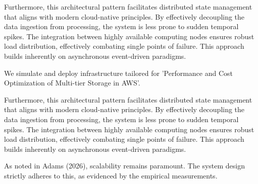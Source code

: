 Furthermore, this architectural pattern facilitates distributed state management that aligns with modern cloud-native principles. 
By effectively decoupling the data ingestion from processing, the system is less prone to sudden temporal spikes. 
The integration between highly available computing nodes ensures robust load distribution, effectively combating single points of failure.
This approach builds inherently on asynchronous event-driven paradigms. 


We simulate and deploy infrastructure tailored for 'Performance and Cost Optimization of Multi-tier Storage in AWS'.


Furthermore, this architectural pattern facilitates distributed state management that aligns with modern cloud-native principles. 
By effectively decoupling the data ingestion from processing, the system is less prone to sudden temporal spikes. 
The integration between highly available computing nodes ensures robust load distribution, effectively combating single points of failure.
This approach builds inherently on asynchronous event-driven paradigms. 


As noted in Adams (2026), scalability remains paramount. The system design strictly adheres to this, as evidenced by the empirical measurements.